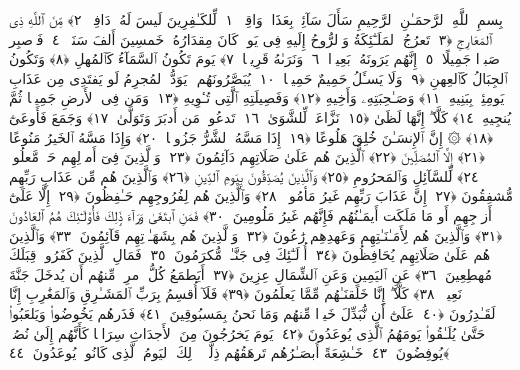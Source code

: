 
  
    
  
    
    

\nopagebreak
  بِسمِ ٱللَّهِ ٱلرَّحمَـٰنِ ٱلرَّحِيمِ
  سَأَلَ سَآئِلٌۢ بِعَذَابٍۢ وَاقِعٍۢ ﴿١﴾
 لِّلكَـٰفِرِينَ لَيسَ لَهُۥ دَافِعٌۭ ﴿٢﴾
 مِّنَ ٱللَّهِ ذِى ٱلمَعَارِجِ ﴿٣﴾
 تَعرُجُ ٱلمَلَـٰٓئِكَةُ وَٱلرُّوحُ إِلَيهِ فِى يَومٍۢ كَانَ مِقدَارُهُۥ خَمسِينَ أَلفَ سَنَةٍۢ ﴿٤﴾
 فَٱصبِر صَبرًۭا جَمِيلًا ﴿٥﴾
 إِنَّهُم يَرَونَهُۥ بَعِيدًۭا ﴿٦﴾
 وَنَرَىٰهُ قَرِيبًۭا ﴿٧﴾
 يَومَ تَكُونُ ٱلسَّمَآءُ كَٱلمُهلِ ﴿٨﴾
 وَتَكُونُ ٱلجِبَالُ كَٱلعِهنِ ﴿٩﴾
 وَلَا يَسـَٔلُ حَمِيمٌ حَمِيمًۭا ﴿١٠﴾
 يُبَصَّرُونَهُم ۚ يَوَدُّ ٱلمُجرِمُ لَو يَفتَدِى مِن عَذَابِ يَومِئِذٍۭ بِبَنِيهِ ﴿١١﴾
 وَصَـٰحِبَتِهِۦ وَأَخِيهِ ﴿١٢﴾
 وَفَصِيلَتِهِ ٱلَّتِى تُـٔوِيهِ ﴿١٣﴾
 وَمَن فِى ٱلأَرضِ جَمِيعًۭا ثُمَّ يُنجِيهِ ﴿١٤﴾
 كَلَّآ ۖ إِنَّهَا لَظَىٰ ﴿١٥﴾
 نَزَّاعَةًۭ لِّلشَّوَىٰ ﴿١٦﴾
 تَدعُوا۟ مَن أَدبَرَ وَتَوَلَّىٰ ﴿١٧﴾
 وَجَمَعَ فَأَوعَىٰٓ ﴿١٨﴾
 ۞ إِنَّ ٱلإِنسَـٰنَ خُلِقَ هَلُوعًا ﴿١٩﴾
 إِذَا مَسَّهُ ٱلشَّرُّ جَزُوعًۭا ﴿٢٠﴾
 وَإِذَا مَسَّهُ ٱلخَيرُ مَنُوعًا ﴿٢١﴾
 إِلَّا ٱلمُصَلِّينَ ﴿٢٢﴾
 ٱلَّذِينَ هُم عَلَىٰ صَلَاتِهِم دَآئِمُونَ ﴿٢٣﴾
 وَٱلَّذِينَ فِىٓ أَموَٟلِهِم حَقٌّۭ مَّعلُومٌۭ ﴿٢٤﴾
 لِّلسَّآئِلِ وَٱلمَحرُومِ ﴿٢٥﴾
 وَٱلَّذِينَ يُصَدِّقُونَ بِيَومِ ٱلدِّينِ ﴿٢٦﴾
 وَٱلَّذِينَ هُم مِّن عَذَابِ رَبِّهِم مُّشفِقُونَ ﴿٢٧﴾
 إِنَّ عَذَابَ رَبِّهِم غَيرُ مَأمُونٍۢ ﴿٢٨﴾
 وَٱلَّذِينَ هُم لِفُرُوجِهِم حَـٰفِظُونَ ﴿٢٩﴾
 إِلَّا عَلَىٰٓ أَزوَٟجِهِم أَو مَا مَلَكَت أَيمَـٰنُهُم فَإِنَّهُم غَيرُ مَلُومِينَ ﴿٣٠﴾
 فَمَنِ ٱبتَغَىٰ وَرَآءَ ذَٟلِكَ فَأُو۟لَـٰٓئِكَ هُمُ ٱلعَادُونَ ﴿٣١﴾
 وَٱلَّذِينَ هُم لِأَمَـٰنَـٰتِهِم وَعَهدِهِم رَٰعُونَ ﴿٣٢﴾
 وَٱلَّذِينَ هُم بِشَهَـٰدَٟتِهِم قَآئِمُونَ ﴿٣٣﴾
 وَٱلَّذِينَ هُم عَلَىٰ صَلَاتِهِم يُحَافِظُونَ ﴿٣٤﴾
 أُو۟لَـٰٓئِكَ فِى جَنَّـٰتٍۢ مُّكرَمُونَ ﴿٣٥﴾
 فَمَالِ ٱلَّذِينَ كَفَرُوا۟ قِبَلَكَ مُهطِعِينَ ﴿٣٦﴾
 عَنِ ٱليَمِينِ وَعَنِ ٱلشِّمَالِ عِزِينَ ﴿٣٧﴾
 أَيَطمَعُ كُلُّ ٱمرِئٍۢ مِّنهُم أَن يُدخَلَ جَنَّةَ نَعِيمٍۢ ﴿٣٨﴾
 كَلَّآ ۖ إِنَّا خَلَقنَـٰهُم مِّمَّا يَعلَمُونَ ﴿٣٩﴾
 فَلَآ أُقسِمُ بِرَبِّ ٱلمَشَـٰرِقِ وَٱلمَغَٰرِبِ إِنَّا لَقَـٰدِرُونَ ﴿٤٠﴾
 عَلَىٰٓ أَن نُّبَدِّلَ خَيرًۭا مِّنهُم وَمَا نَحنُ بِمَسبُوقِينَ ﴿٤١﴾
 فَذَرهُم يَخُوضُوا۟ وَيَلعَبُوا۟ حَتَّىٰ يُلَـٰقُوا۟ يَومَهُمُ ٱلَّذِى يُوعَدُونَ ﴿٤٢﴾
 يَومَ يَخرُجُونَ مِنَ ٱلأَجدَاثِ سِرَاعًۭا كَأَنَّهُم إِلَىٰ نُصُبٍۢ يُوفِضُونَ ﴿٤٣﴾
 خَـٰشِعَةً أَبصَـٰرُهُم تَرهَقُهُم ذِلَّةٌۭ ۚ ذَٟلِكَ ٱليَومُ ٱلَّذِى كَانُوا۟ يُوعَدُونَ ﴿٤٤﴾
 
